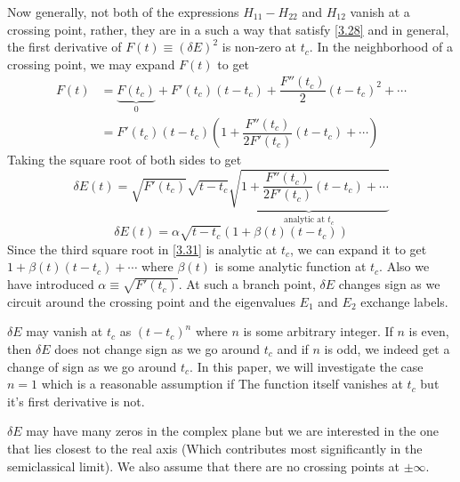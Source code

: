 \documentclass[12pt,a4paper]{article}
\begin{document}
	Now generally, not both of the expressions $H_{11} - H_{22}$ and $H_{12}$ vanish at a crossing point, rather, they are in a such a  way that satisfy \eqref{3.28} and in general, the first derivative of $F(t) \equiv \left(\delta E \right)^{2}$ is non-zero at $t_{c}$. In the neighborhood of a crossing point, we may expand $F(t)$ to get
	\begin{align}
		F(t) &= \underbrace{F(t_{c})}_{0} + F'(t_{c}) \left( t - t_{c} \right) + \dfrac{F''(t_{c})}{2} \left( t - t_{c} \right)^{2} + \cdots \\
		&= F'(t_{c}) \left( t - t_{c} \right) \left( 1 + \dfrac{F''(t_{c})}{2F'(t_{c})} \left( t - t_{c} \right) + \cdots \right)
	\end{align}
	Taking the square root of both sides to get
	\begin{equation}
		\delta E(t) = \sqrt{F'(t_{c})} \sqrt{t - t_{c}} \underbrace{\sqrt{1 + \dfrac{F''(t_{c})}{2F'(t_{c})} \left( t - t_{c} \right) + \cdots}}_{\text{analytic at $t_{c}$}} \label{3.31}
	\end{equation}
	\begin{equation}
		\boxed{\delta E(t) = \alpha \sqrt{t - t_{c}} \left( 1 + \beta(t) \left( t - t_{c} \right) \right)} \label{3.32}
	\end{equation}
	Since the third square root in \eqref{3.31} is analytic at $t_{c}$, we can expand it to get \newline $1 + \beta(t) \left( t - t_{c} \right) + \cdots $ where $\beta(t)$ is some analytic function at $t_{c}$. Also we have introduced $\alpha \equiv \sqrt{F'(t_{c})}$. At such a branch point, $\delta E$ changes sign as we circuit around the crossing point and the eigenvalues $E_{1}$ and $E_{2}$ exchange labels.
	
	$\delta E$ may vanish at $t_{c}$ as $\left( t - t_{c} \right)^{n}$ where $n$ is some arbitrary integer. If $n$ is even, then $\delta E$ does not change sign as we go around $t_{c}$ and if $n$ is odd, we indeed get a change of sign as we go around $t_{c}$. In this paper, we will investigate the case $n = 1$ which is a reasonable assumption if The function itself vanishes at $t_{c}$ but it's first derivative is not.
	
	$\delta E$ may have many zeros in the complex plane but we are interested in the one that lies closest to the real axis (Which contributes most significantly in the semiclassical limit). We also assume that there are no crossing points at $\pm \infty$.
	
\end{document}
